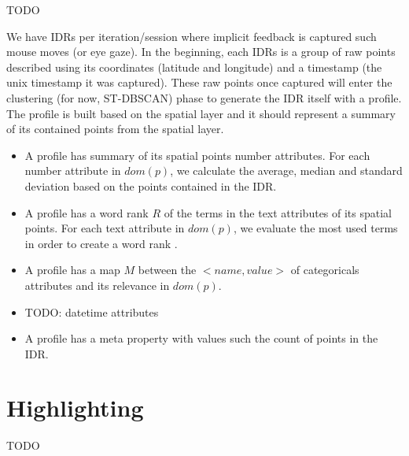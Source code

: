 TODO

We have IDRs per iteration/session where implicit feedback is captured such mouse moves (or eye gaze). In the beginning, each IDRs is a group of raw points described using its coordinates (latitude and longitude) and a timestamp (the unix timestamp it was captured). These raw points once captured will enter the clustering (for now, ST-DBSCAN) phase to generate the IDR itself with a profile. The profile is built based on the spatial layer and it should represent a summary of its contained points from the spatial layer.

\begin{itemize}
	\item A profile has summary of its spatial points number attributes. For each number attribute in $dom(p)$, we calculate the average, median and standard deviation based on the points contained in the IDR.

	\item A profile has a word rank $R$ of the terms in the text attributes of its spatial points. For each text attribute in $dom(p)$, we evaluate the most used terms in order to create a word rank \cite{kumar2017}.

	\item A profile has a map $M$ between the $<name, value>$ of categoricals attributes and its relevance in $dom(p)$.

	\item TODO: datetime attributes

	\item A profile has a meta property with values such the count of points in the IDR.
\end{itemize}

\section{Highlighting}

TODO